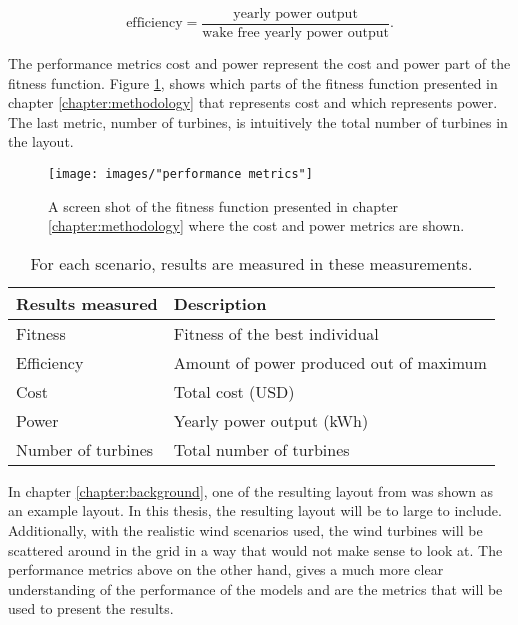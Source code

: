 \begin{equation}
\textrm{efficiency} = \frac{\textrm{yearly power output}}{\textrm{wake free yearly power output}}.
\label{equation:efficiency}
\end{equation}

\noindent The performance metrics cost and power represent the cost and power part of the fitness function. Figure \ref{figure:performance metrics cost and power}, shows which parts of the fitness function presented in chapter \ref{chapter:methodology} that represents cost and which represents power. The last metric, number of turbines, is intuitively the total number of turbines in the layout.\\ 

\begin{figure}[h!]
\begin{center}
\texttt{[image: images/"performance metrics"]}
\caption{A screen shot of the fitness function presented in chapter \ref{chapter:methodology} where the cost and power metrics are shown.}
\label{figure:performance metrics cost and power}
\end{center}
\end{figure}

\begin{table}[h!]
\centering
\caption{For each scenario, results are measured in these measurements.}
\label{table:performance metrics}
\centering
\begin{tabular}{l|l}
\textbf{Results measured}   & \textbf{Description} \\
\hline
Fitness                     & Fitness of the best individual \\
Efficiency                  & Amount of power produced out of maximum \\
Cost                        & Total cost (USD)\\
Power                       & Yearly power output (kWh) \\
Number of turbines          & Total number of turbines
\end{tabular}
\end{table}

\noindent In chapter \ref{chapter:background}, one of the resulting layout from \citep{Grady} was shown as an example layout. In this thesis, the resulting layout will be to large to include. Additionally, with the realistic wind scenarios used, the wind turbines will be scattered around in the grid in a way that would not make sense to look at. The performance metrics above on the other hand, gives a much more clear understanding of the performance of the models and are the metrics that will be used to present the results.\\



